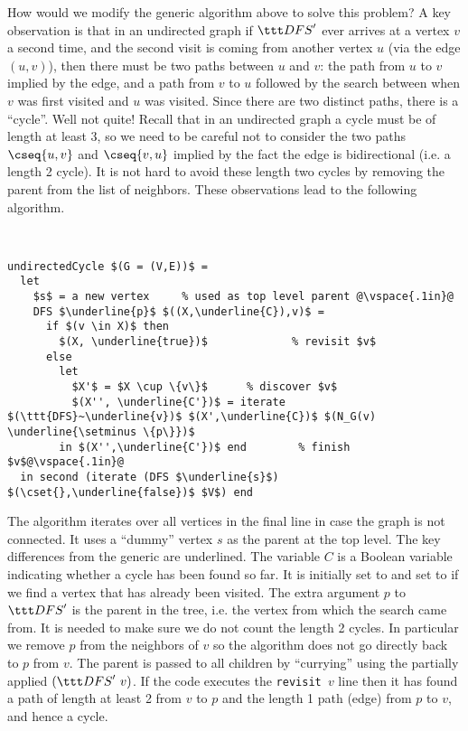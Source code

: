How would we modify the generic \dfs{} algorithm above to solve this
problem?  A key observation is that in an undirected graph if $\dfs'$
ever arrives at a vertex $v$ a second time, and the second visit is
coming from another vertex $u$ (via the edge $(u,v)$), then there must
be two paths between $u$ and $v$: the path from $u$ to $v$ implied by
the edge, and a path from $v$ to $u$ followed by the search between
when $v$ was first visited and $u$ was visited.  Since there are two
distinct paths, there is a ``cycle''.  Well not quite!  Recall that in
an undirected graph a cycle must be of length at least 3, so we need
to be careful not to consider the two paths $\cseq{u,v}$ and
$\cseq{v,u}$ implied by the fact the edge is bidirectional (i.e. a
length 2 cycle).  It is not hard to avoid these length two cycles by
removing the parent from the list of neighbors.
These observations lead to the following algorithm.


\begin{algorithm}~
\label{lst:dfs::cycle-undir}
\begin{lstlisting}
undirectedCycle $(G = (V,E))$ = 
  let
    $s$ = a new vertex     % used as top level parent @\vspace{.1in}@
    DFS $\underline{p}$ $((X,\underline{C}),v)$ =
      if $(v \in X)$ then 
        $(X, \underline{true})$             % revisit $v$
      else 
        let         
          $X'$ = $X \cup \{v\}$      % discover $v$ 
          $(X'', \underline{C'})$ = iterate $(\ttt{DFS}~\underline{v})$ $(X',\underline{C})$ $(N_G(v) \underline{\setminus \{p\}})$
        in $(X'',\underline{C'})$ end        % finish $v$@\vspace{.1in}@
  in second (iterate (DFS $\underline{s}$) $(\cset{},\underline{false})$ $V$) end
\end{lstlisting}
\end{algorithm}

The algorithm iterates over all vertices in the final line in case the
graph is not connected.   It uses a ``dummy'' vertex $s$ as the parent
at the top level.   The key differences from the generic \dfs{} are underlined.
The variable $C$ is a Boolean variable indicating whether a cycle has
been found so far.  It is initially set to \cfalse{} and set to
\ctrue{} if we find a vertex that has already been visited.  The extra
argument $p$ to $\dfs'$ is the parent in the \dfs{} tree, i.e. the
vertex from which the search came from.  It is needed to make sure we
do not count the length 2 cycles.  In particular we remove $p$ from
the neighbors of $v$ so the algorithm does not go directly back to $p$
from $v$.  The parent is passed to all children by ``currying'' using
the partially applied $(\dfs'~v)$.  If the code executes the
\texttt{revisit $v$} line then it has found a path of length at least
2 from $v$ to $p$ and the length 1 path (edge) from $p$ to $v$, and
hence a cycle.

